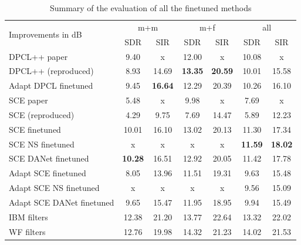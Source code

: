 \documentclass[master, tikz, final,11pt, dvipdfmx]{iscs-thesis}
\begin{document}
\begin{table}[h]
\centering
\begin{tabular}{l|c|c|c|c|c|c}
\multirow{2}{*}{Improvements in dB} & \multicolumn{2}{c|}{m+m} & \multicolumn{2}{c|}{m+f} & \multicolumn{2}{c}{all} \\ 
\cline{2-7} 
 & SDR & SIR & SDR & SIR & SDR & SIR \\ 
\hline 
DPCL++ paper \cite{DPCLV2} & 9.40 & x & 12.00 & x & 10.08 & x \\ 
DPCL++ (reproduced) & 8.93 & 14.69 & \cellcolor{green}\textbf{13.35} & \cellcolor{green}\textbf{20.59} & 10.01 & 15.58 \\ 
Adapt DPCL finetuned & 9.45 & \textbf{16.64} & 12.29 & 20.39 & 10.26 & 16.10 \\ 
\hline
\hline
SCE paper \cite{SCE} & 5.48 & x & 9.98 & x & 7.69 & x \\ 
SCE (reproduced) & 4.29 & 9.75 & 7.69 & 14.47 & 5.89 & 12.23 \\ 
SCE finetuned & 10.01 & 16.10 & 13.02 & 20.13 & 11.30 & 17.34 \\ 
SCE NS finetuned & x & x & x & x & \cellcolor{green}\textbf{11.59} & \cellcolor{green}\textbf{18.02} \\ 
SCE DANet finetuned & \cellcolor{green}\textbf{10.28} & \cellcolor{green}16.51 & 12.92 & 20.05 & 11.42 & 17.78 \\ 
Adapt SCE finetuned  & 8.05 & 13.96 & 11.51 & 19.31 & 9.63 & 15.48 \\ 
Adapt SCE NS finetuned& x & x & x & x & 9.56 & 15.09 \\ 
Adapt SCE DANet finetuned & 9.65 & 15.47 & 11.95 & 18.95 & 9.94 & 15.49 \\
\hline
\hline
IBM filters & 12.38 & 21.20 & 13.77 & 22.64 & 13.32 & 22.02 \\ 
WF filters & 12.76 & 19.98 & 14.32 & 21.23 & 14.02 & 21.53 \\ 

\end{tabular}
\caption{Summary of the evaluation of all the finetuned methods}
\label{global}
\end{table}
\end{document}
